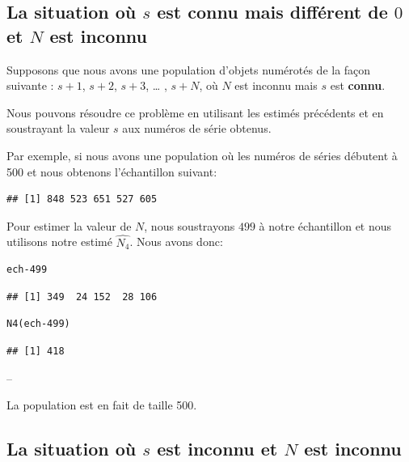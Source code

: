 \documentclass[10pt]{article}
\begin{document}
\hypertarget{la-situation-ou-s-est-connu-mais-different-de-0-et-n-est-inconnu}{%
\subsection{\texorpdfstring{La situation où \(s\) est \textbf{connu}
mais différent de \(0\) et \(N\) est
\textbf{inconnu}}{La situation où s est connu mais différent de 0 et N est inconnu}}\label{la-situation-ou-s-est-connu-mais-different-de-0-et-n-est-inconnu}}

Supposons que nous avons une population d'objets numérotés de la façon
suivante : \(s+1\), \(s+2\), \(s+3\), \ldots{} , \(s+N\), où \(N\) est
inconnu mais \(s\) est \textbf{connu}.

Nous pouvons résoudre ce problème en utilisant les estimés précédents et
en soustrayant la valeur \(s\) aux numéros de série obtenus.

Par exemple, si nous avons une population où les numéros de séries
débutent à 500 et nous obtenons l'échantillon suivant:

\begin{verbatim}
## [1] 848 523 651 527 605
\end{verbatim}

Pour estimer la valeur de \(N\), nous soustrayons \(499\) à notre
échantillon et nous utilisons notre estimé \(\hat{N_4}\). Nous avons
donc:

\begin{verbatim}
ech-499
\end{verbatim}

\begin{verbatim}
## [1] 349  24 152  28 106
\end{verbatim}

\begin{verbatim}
N4(ech-499)
\end{verbatim}

\begin{verbatim}
## [1] 418
\end{verbatim}

--

La population est en fait de taille 500.

\hypertarget{la-situation-ou-s-est-inconnu-et-n-est-inconnu}{%
\subsection{\texorpdfstring{La situation où \(s\) est \textbf{inconnu}
et \(N\) est
\textbf{inconnu}}{La situation où s est inconnu et N est inconnu}}\label{la-situation-ou-s-est-inconnu-et-n-est-inconnu}}
\end{document}
